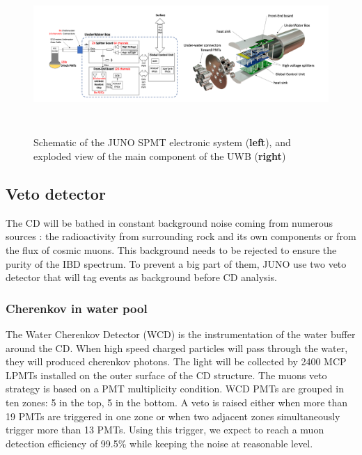 \documentclass[../main.tex]{subfiles}
\begin{document}
\begin{figure}[ht]
  \centering
  \includegraphics[height=6cm]{images/juno/SPMT_readout.png}
  \caption{Schematic of the JUNO SPMT electronic system (\textbf{left}), and exploded view of the main component of the UWB (\textbf{right})}
  \label{fig:juno:spmt_elec}
\end{figure}

\subsection{Veto detector}

The CD will be bathed in constant background noise coming from numerous sources : the radioactivity from surrounding rock and its own components or from the flux of cosmic muons. This background needs to be rejected to ensure the purity of the IBD spectrum. To prevent a big part of them, JUNO use two veto detector that will tag events as background before CD analysis.

\subsubsection{Cherenkov in water pool}

The Water Cherenkov Detector (WCD) is the instrumentation of the water buffer around the CD. When high speed charged particles will pass through the water, they will produced cherenkov photons. The light will be collected by 2400 MCP LPMTs installed on the outer surface of the CD structure. The  muons veto strategy is based on a PMT multiplicity condition. WCD PMTs are grouped in ten zones: 5 in the top, 5 in the bottom. A veto is raised either when more than 19 PMTs are triggered in one zone or when two adjacent zones simultaneously trigger more than 13 PMTs. Using this trigger, we expect to reach a muon detection efficiency of 99.5\% while keeping the noise at reasonable level.
\end{document}
